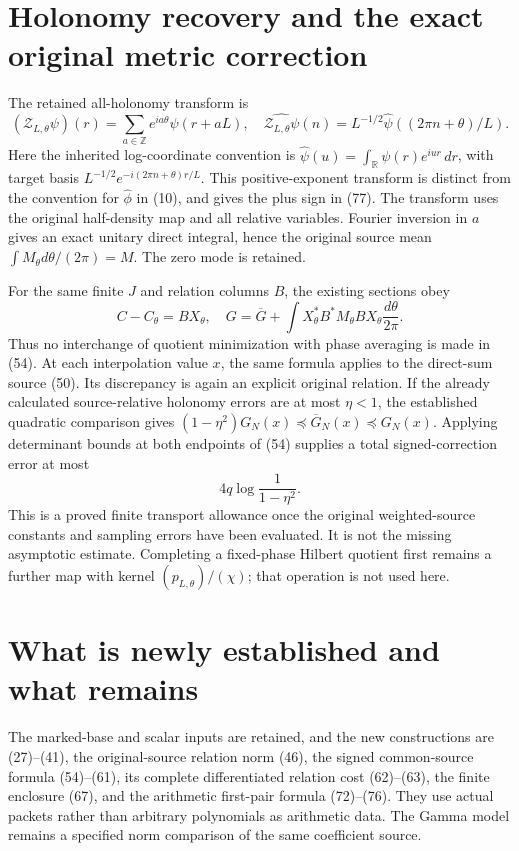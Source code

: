 \documentclass[11pt]{article}
\begin{document}
\section{Holonomy recovery and the exact original metric correction}
The retained all-holonomy transform is
\[
 (\mathcal Z_{L,\theta}\psi)(r)
   =\sum_{a\in\mathbb Z}e^{ia\theta}\psi(r+aL),
 \quad\widehat{\mathcal Z_{L,\theta}\psi}(n)
   =L^{-1/2}\widehat\psi((2\pi n+\theta)/L).
 \tag{77}
\]
Here the inherited log-coordinate convention is $\widehat\psi(u)=\int_{\mathbb R}\psi(r)e^{iur}\,dr$, with target basis $L^{-1/2}e^{-i(2\pi n+\theta)r/L}$. This positive-exponent transform is distinct from the convention for $\widehat\phi$ in (10), and gives the plus sign in (77). The transform uses the original half-density map and all relative variables. Fourier inversion in $a$ gives an exact unitary direct integral, hence the original source mean $\int M_\theta d\theta/(2\pi)=M$. The zero mode is retained.

For the same finite $J$ and relation columns $B$, the existing sections obey
\[
 C-C_\theta=BX_\theta,\quad
 G=\overline G+\int X_\theta^*B^*M_\theta BX_\theta\frac{d\theta}{2\pi}.
 \tag{78}
\]
Thus no interchange of quotient minimization with phase averaging is made in (54). At each interpolation value $x$, the same formula applies to the direct-sum source (50). Its discrepancy is again an explicit original relation. If the already calculated source-relative holonomy errors are at most $\eta<1$, the established quadratic comparison gives $(1-\eta^2)G_N(x)\preceq\overline G_N(x)\preceq G_N(x)$. Applying determinant bounds at both endpoints of (54) supplies a total signed-correction error at most
\[
 4q\log\frac1{1-\eta^2}.
 \tag{79}
\]
This is a proved finite transport allowance once the original weighted-source constants and sampling errors have been evaluated. It is not the missing asymptotic estimate. Completing a fixed-phase Hilbert quotient first remains a further map with kernel $(p_{L,\theta})/(\chi)$; that operation is not used here.

\section{What is newly established and what remains}
The marked-base and scalar inputs are retained, and the new constructions are (27)--(41), the original-source relation norm (46), the signed common-source formula (54)--(61), its complete differentiated relation cost (62)--(63), the finite enclosure (67), and the arithmetic first-pair formula (72)--(76). They use actual packets rather than arbitrary polynomials as arithmetic data. The Gamma model remains a specified norm comparison of the same coefficient source.
\end{document}
